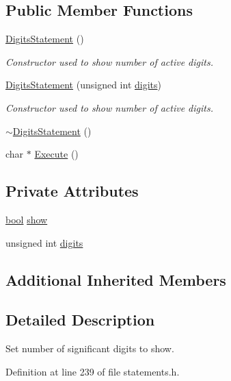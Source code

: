 \subsection*{Public Member Functions}
\begin{DoxyCompactItemize}
\item 
\hyperlink{classDigitsStatement_a37883ab7d81a7ee7332d81cb2f84abf1}{Digits\+Statement} ()
\begin{DoxyCompactList}\small\item\em Constructor used to show number of active digits. \end{DoxyCompactList}\item 
\hyperlink{classDigitsStatement_ac099980b5e6606bbeb82598dca08813b}{Digits\+Statement} (unsigned int \hyperlink{classDigitsStatement_a9d71ae96bc7bcd432deb9e4700e89550}{digits})
\begin{DoxyCompactList}\small\item\em Constructor used to show number of active digits. \end{DoxyCompactList}\item 
\hyperlink{classDigitsStatement_a82557d796508f17d114c48dbebee00a8}{$\sim$\+Digits\+Statement} ()
\item 
char $\ast$ \hyperlink{classDigitsStatement_a5a16b621b4759cdc0bf980b01858350b}{Execute} ()
\end{DoxyCompactItemize}
\subsection*{Private Attributes}
\begin{DoxyCompactItemize}
\item 
\hyperlink{platform_8h_a1062901a7428fdd9c7f180f5e01ea056}{bool} \hyperlink{classDigitsStatement_ae069e8baf410c17d2b2b60c143daabb5}{show}
\item 
unsigned int \hyperlink{classDigitsStatement_a9d71ae96bc7bcd432deb9e4700e89550}{digits}
\end{DoxyCompactItemize}
\subsection*{Additional Inherited Members}


\subsection{Detailed Description}
Set number of significant digits to show. 

Definition at line 239 of file statements.\+h.



